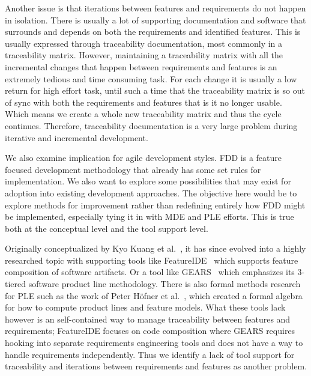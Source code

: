 Another issue is that iterations between features and requirements do not happen in isolation. There is usually a lot of supporting documentation and software that surrounds and depends on both the requirements and identified features. This is usually expressed through traceability documentation, most commonly in a traceability matrix. However, maintaining a traceability matrix with all the incremental changes that happen between requirements and features is an extremely tedious and time consuming task. For each change it is usually a low return for high effort task, until such a time that the traceability matrix is so out of sync with both the requirements and features that is it no longer usable. Which means we create a whole new traceability matrix and thus the cycle continues. Therefore, traceability documentation is a very large problem during iterative and incremental development.


We also examine implication for agile development styles. \ac{FDD} is a feature focused development methodology that already has some set rules for implementation. We also want to explore some possibilities that may exist for adoption into existing development approaches. The objective here would be to explore methods for improvement rather than redefining entirely how \ac{FDD} might be implemented, especially tying it in with \ac{MDE} and \ac{PLE} efforts. This is true both at the conceptual level and the tool support level.

Originally conceptualized by Kyo Kuang et al.~\cite{kang1990feature, kang1998form}, it has since evolved into a highly researched topic with supporting tools like FeatureIDE~\cite{kastner2009featureide, thum2014featureide} which supports feature composition of software artifacts. Or a tool like GEARS~\cite{GEARS} which emphasizes its 3-tiered software product line methodology. There is also formal methods research for \ac{PLE} such as the work of Peter H\"{o}fner et al.~\cite{hofner2006feature,hofner2011algebra}, which created a formal algebra for how to compute product lines and feature models. What these tools lack however is an self-contained way to manage traceability between features and requirements; FeatureIDE focuses on code composition where GEARS requires hooking into separate requirements engineering tools and does not have a way to handle requirements independently. Thus we identify a lack of tool support for traceability and iterations between requirements and features as another problem.

